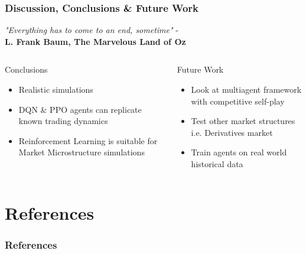 \documentclass[aspectratio=1610]{beamer}
\begin{document}
\begin{frame}
  \frametitle{\hfill Discussion, Conclusions \& Future Work}
\textit{"Everything has to come to an end, sometime"} - \\   \textbf{L. Frank Baum, The Marvelous Land of Oz}
  \begin{columns}[t]
    \begin{block}{Conclusions}
    \begin{itemize}
        \item Realistic simulations
        \item DQN \& PPO agents can replicate known trading dynamics
        \item Reinforcement Learning is suitable for Market Microstructure simulations
    \end{itemize}
    \end{block}
    
    \begin{block}{Future Work}
    \begin{itemize}
        \item Look at multiagent framework with competitive self-play
        \item Test other market structures i.e. Derivatives market
        \item Train agents on real world historical data
    \end{itemize}
    \end{block}
\end{columns}

\end{frame}

\section{References}

\begin{frame}[shrink=35]
  \frametitle{\hfill References}
  \printbibliography

\end{frame}
\end{document}
